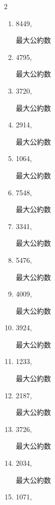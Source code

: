 \begin{multicols}{2}
\begin{enumerate}
  \item 8449,

        最大公約数

\columnbreak %

  \item 4795,

        最大公約数

  \item 3720,

        最大公約数

  \item 2914,

        最大公約数

  \item 1064,

        最大公約数

  \item 7548,

        最大公約数

\columnbreak %

\resetques

  \item 3341,

        最大公約数

  \item 5476,

        最大公約数

  \item 4009,

        最大公約数

  \item 3924,

        最大公約数

  \item 1233,

        最大公約数

\columnbreak %

  \item 2187,

        最大公約数

  \item 3726,

        最大公約数

  \item 2034,

        最大公約数

  \item 1071,


\end{enumerate}
\end{multicols}
